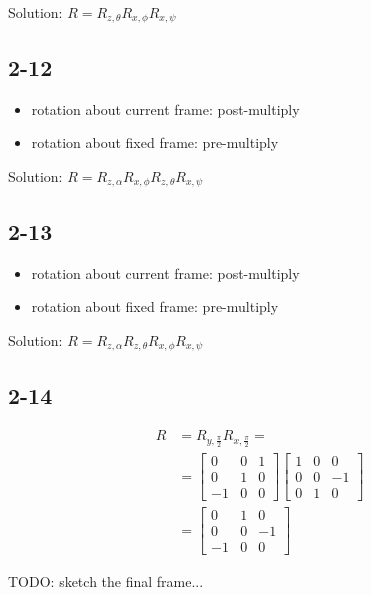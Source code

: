 Solution: $R=R_{z,\theta}R_{x,\phi}R_{x,\psi}$

\subsection*{2-12}
\begin{itemize}
	\item rotation about current frame: post-multiply
	\item rotation about fixed frame: pre-multiply
\end{itemize}

Solution: $R= R_{z,\alpha}R_{x,\phi}R_{z,\theta}R_{x,\psi}$

\subsection*{2-13}

\begin{itemize}
	\item rotation about current frame: post-multiply
	\item rotation about fixed frame: pre-multiply
\end{itemize}

Solution: $R= R_{z,\alpha}R_{z,\theta} R_{x,\phi}R_{x,\psi}$

\subsection*{2-14}
\begin{align*}
R &= R_{y,\frac{\pi}{2}} R_{x,\frac{\pi}{2}}=\\ 
&=\left[\begin{array}{ccc} 
0 & 0 & 1 \\
0 & 1 & 0 \\  
-1 & 0 & 0    
\end{array}\right]
\left[\begin{array}{ccc} 
1 & 0 & 0 \\
0 & 0 & -1 \\  
0 & 1 & 0    
\end{array}\right]\\
&=\left[\begin{array}{ccc} 
0 & 1 & 0 \\
0 & 0 & -1 \\  
-1 & 0 & 0    
\end{array}\right]
\end{align*}

TODO: sketch the final frame...

